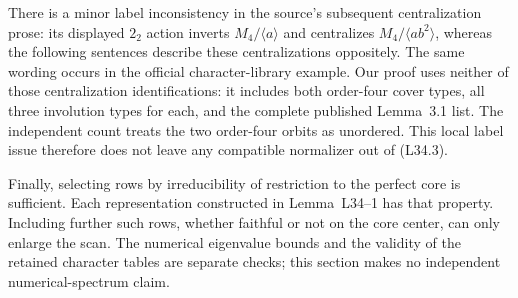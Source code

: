 There is a minor label inconsistency in the source's subsequent
centralization prose: its displayed $2_2$ action inverts
$M_4/\langle a\rangle$ and centralizes
$M_4/\langle ab^2\rangle$, whereas the following sentences describe
these centralizations oppositely.  The same wording occurs in the
official character-library example.  Our proof uses neither of
those centralization identifications: it includes both order-four
cover types, all three involution types for each, and the complete
published Lemma~3.1 list.  The independent count treats the two
order-four orbits as unordered.  This local label issue therefore
does not leave any compatible normalizer out of (L34.3).

Finally, selecting rows by irreducibility of restriction to the
perfect core is sufficient.  Each representation constructed in
Lemma~L34--1 has that property.  Including further such rows,
whether faithful or not on the core center, can only enlarge the
scan.  The numerical eigenvalue bounds and the validity of the
retained character tables are separate checks; this section makes
no independent numerical-spectrum claim.
